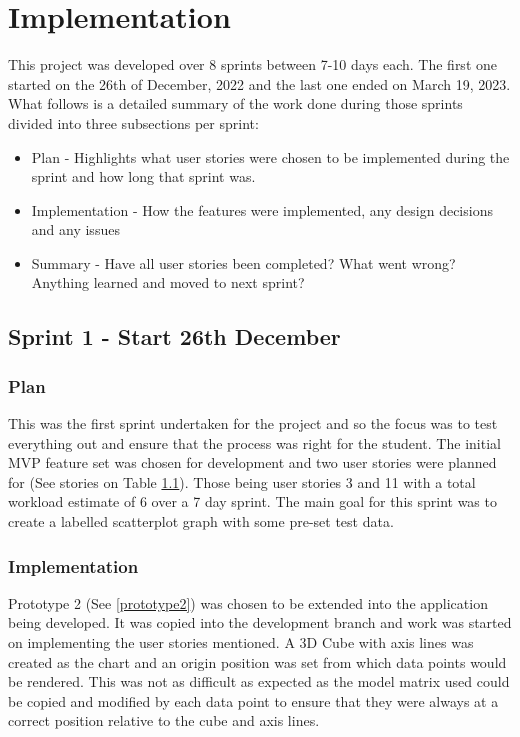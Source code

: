 
\section{Implementation} \label{implementation}
This project was developed over 8 sprints between 7-10 days each. The first one started on the 26th of December, 2022 and the last one ended on March 19, 2023. What follows is a detailed summary of the work done during those sprints divided into three subsections per sprint:
\begin{itemize}
    \item Plan - Highlights what user stories were chosen to be implemented during the sprint and how long that sprint was.
    \item Implementation - How the features were implemented, any design decisions and any issues
    \item Summary - Have all user stories been completed? What went wrong? Anything learned and moved to next sprint?
\end{itemize}

\subsection{Sprint 1 - Start 26th December} \label{sprint1}
\subsubsection{Plan}
This was the first sprint undertaken for the project and so the focus was to test everything out and ensure that the process was right for the student. The initial MVP feature set was chosen for development and two user stories were planned for (See stories on Table \ref{sprint1}). Those being user stories 3 and 11 with a total workload estimate of 6 over a 7 day sprint. The main goal for this sprint was to create a labelled scatterplot graph with some pre-set test data.

\subsubsection{Implementation} \label{sprint1-imp}
Prototype 2 (See \ref{prototype2}) was chosen to be extended into the application being developed. It was copied into the development branch and work was started on implementing the user stories mentioned. A 3D Cube with axis lines was created as the chart and an origin position was set from which data points would be rendered. This was not as difficult as expected as the model matrix used could be copied and modified by each data point to ensure that they were always at a correct position relative to the cube and axis lines.


